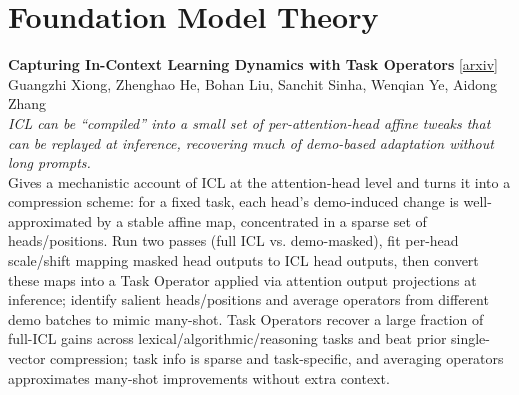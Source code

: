 \documentclass[12pt,letterpaper]{article}
\begin{document}
\medskip


\section*{Foundation Model Theory}

{\small\textbf{Capturing In-Context Learning Dynamics with Task Operators}} {\scriptsize[\href{https://arxiv.org/abs/2610.01054}{arxiv}]}\\
{\scriptsize Guangzhi Xiong, Zhenghao He, Bohan Liu, Sanchit Sinha, Wenqian Ye, Aidong Zhang}\\

{\small\textit{ICL can be ``compiled'' into a small set of per-attention-head affine tweaks that can be replayed at inference, recovering much of demo-based adaptation without long prompts.}}\\[1pt]
{\footnotesize Gives a mechanistic account of ICL at the attention-head level and turns it into a compression scheme: for a fixed task, each head's demo-induced change is well-approximated by a stable affine map, concentrated in a sparse set of heads/positions. Run two passes (full ICL vs. demo-masked), fit per-head scale/shift mapping masked head outputs to ICL head outputs, then convert these maps into a Task Operator applied via attention output projections at inference; identify salient heads/positions and average operators from different demo batches to mimic many-shot. Task Operators recover a large fraction of full-ICL gains across lexical/algorithmic/reasoning tasks and beat prior single-vector compression; task info is sparse and task-specific, and averaging operators approximates many-shot improvements without extra context.}

\medskip
\end{document}
